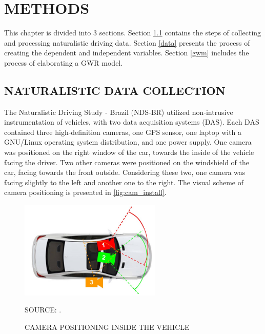 
\chapter{METHODS} \label{cap:methods}

This chapter is divided into 3 sections. Section \ref{ndsc} contains the steps of collecting and processing naturalistic driving data. Section \ref{data} presents the process of creating the dependent and independent variables. Section \ref{gwm} includes the process of elaborating a GWR model. 
 
\section{NATURALISTIC DATA COLLECTION} \label{ndsc}




The Naturalistic Driving Study - Brazil (NDS-BR) utilized non-intrusive instrumentation of vehicles, with two data acquisition systems (DAS). Each DAS contained three high-definition cameras, one GPS sensor, one laptop with a GNU/Linux operating system distribution, and one power supply. One camera was positioned on the right window of the car, towards the inside of the vehicle facing the driver. Two other cameras were positioned on the windshield of the car, facing towards the front outside. Considering these two, one camera was facing slightly to the left and another one to the right. The visual scheme of camera positioning is presented in \autoref{fig:cam_install}.

\begin{figure}[!htbp]
    \centering\footnotesize
    \captionsetup{font=footnotesize}
    \caption{CAMERA POSITIONING INSIDE THE VEHICLE}
    \includegraphics[width=0.6\textwidth]{fig/cam_install.png}
    \label{fig:cam_install}
    \par SOURCE: \textcite{Amancio2021}.
\end{figure}

